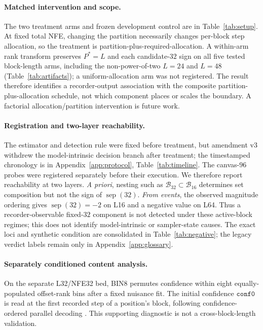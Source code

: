 \documentclass{article}
\begin{document}
\paragraph{Matched intervention and scope.}
The two treatment arms and frozen development control are in
Table~\ref{tab:setup}. At fixed total NFE, changing the partition necessarily
changes per-block step allocation, so the treatment is
partition-plus-required-allocation. A within-arm rank transform preserves
$P^*{=}L$ and each candidate-$32$ sign on all five tested block-length arms,
including the non-power-of-two $L{=}24$ and $L{=}48$
(Table~\ref{tab:artifacts}); a uniform-allocation arm was not registered. The
result therefore identifies a recorder-output association with the composite
partition-plus-allocation schedule, not which component places or scales the
boundary. A factorial allocation/partition intervention is future work.

\paragraph{Registration and two-layer reachability.}
The estimator and detection rule were fixed before treatment, but amendment v3
withdrew the model-intrinsic decision branch after treatment; the timestamped
chronology is in Appendix~\ref{app:protocol}, Table~\ref{tab:timeline}. The
canvas-$96$ probes were registered separately before their execution. We therefore
report reachability at two layers. \emph{A priori}, nesting such as
$\mathcal B_{32}\subset\mathcal B_{16}$ determines set composition but not the
sign of $\operatorname{sep}(32)$. \emph{From events}, the observed magnitude
ordering gives $\operatorname{sep}(32)=-2$ on L16 and a negative value on L64.
Thus a recorder-observable fixed-$32$ component is not detected under these
active-block regimes; this does not identify model-intrinsic or sampler-state
causes. The exact loci and synthetic condition are consolidated in
Table~\ref{tab:negative}; the legacy verdict labels remain only in
Appendix~\ref{app:glossary}.

\paragraph{Separately conditioned content analysis.}
On the separate L32/NFE32 bed, BIN8 permutes confidence within eight
equally-populated offset-rank bins after a fixed nuisance fit. The initial
confidence $\texttt{conf0}$ is read at the first recorded step of a position's
block, following confidence-ordered parallel decoding
\citep{ghazvininejad2019maskpredict,nie2025large}. This supporting diagnostic is
not a cross-block-length validation.
\end{document}
